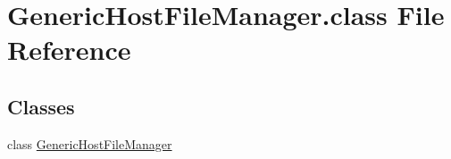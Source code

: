\hypertarget{GenericHostFileManager_8class}{\section{Generic\-Host\-File\-Manager.\-class File Reference}
\label{GenericHostFileManager_8class}
}
\subsection*{Classes}
\begin{DoxyCompactItemize}
\item 
class \hyperlink{classGenericHostFileManager}{Generic\-Host\-File\-Manager}
\end{DoxyCompactItemize}
